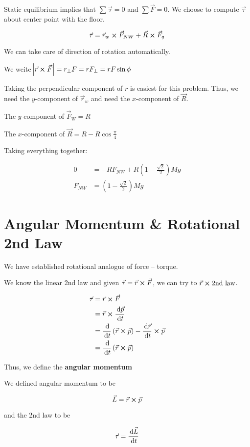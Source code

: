 \begin{sol}
	Static equilibrium implies that $\sum \vec \tau = 0$ and $\sum \vec F = 0$. We choose to compute $\vec \tau$ about center point with the floor.

	\begin{equation}
		\vec\tau = \vec r_w \cross \vec F_{NW} + \vec R \cross \vec F_g
	\end{equation}

	We can take care of direction of rotation automatically.

	We weite $\abs{\vec r \cross \vec F} = r_\perp F = r F_\perp = rF\sin\phi$

	Taking the perpendicular component of $r$ is easiest for this problem. Thus, we need the $y$-component of $\vec r_w$ and need the $x$-component of $\vec R$.

	The $y$-component of $\vec F_W = R$

	The $x$-component of $\vec R = R - R\cos\frac{\pi}{4}$

	Taking everything together:

	\begin{align}
		0 &= -RF_{NW} + R(1 - \frac{\sqrt{2}}{2})Mg\\
		F_{NW} &= \boxed{(1 - \frac{\sqrt{2}}{2})Mg}
	\end{align}
\end{sol}

\section{Angular Momentum \& Rotational 2nd Law}

We have established rotational analogue of force -- torque.

We know the linear 2nd law and given $\vec \tau = \vec r \cross \vec F$, we can try to $\vec r \cross \text{2nd law}$.

\begin{align}
	\vec \tau &= \vec r \cross \vec F\\
	&= \vec r \cross \frac{\D \vec p}{\D t}\\
	&= \frac{\D}{\D t}\left(\vec r \cross \vec p\right) - \frac{\D \vec r}{\D t} \cross \vec p\\
	&= \frac{\D}{\D t}\left(\vec r \cross \vec p\right)
\end{align}

Thus, we define the \textbf{angular momentum}

\begin{definition}
	We defined angular momentum to be

	\begin{equation}
		\vec L = \vec r \cross \vec p
	\end{equation}

	and the 2nd law to be

	\begin{equation}
		\vec \tau = \frac{\D \vec L}{\D t}
	\end{equation}
\end{definition}


